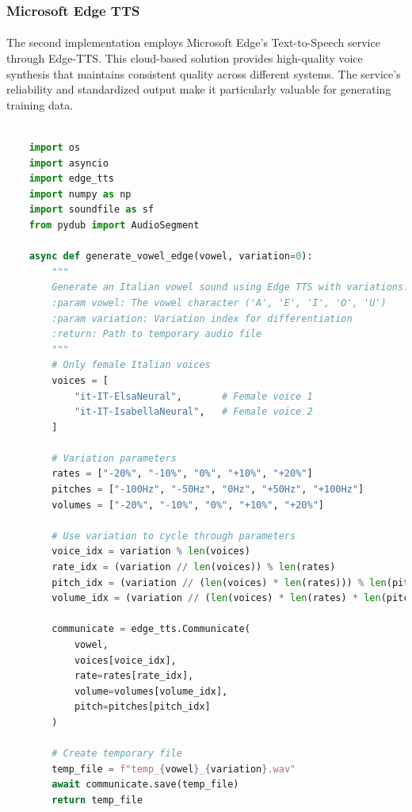 \subsubsection{Microsoft Edge TTS}
\paragraph{}
The second implementation employs Microsoft Edge's Text-to-Speech service through Edge-TTS. This cloud-based solution provides high-quality voice synthesis that maintains consistent quality across different systems. The service's reliability and standardized output make it particularly valuable for generating training data.

\begin{lstlisting}[language=Python, caption={Audio Generation with Edge TTS}]

    import os
    import asyncio
    import edge_tts
    import numpy as np
    import soundfile as sf
    from pydub import AudioSegment
    
    async def generate_vowel_edge(vowel, variation=0):
        """
        Generate an Italian vowel sound using Edge TTS with variations.
        :param vowel: The vowel character ('A', 'E', 'I', 'O', 'U')
        :param variation: Variation index for differentiation
        :return: Path to temporary audio file
        """
        # Only female Italian voices
        voices = [
            "it-IT-ElsaNeural",       # Female voice 1
            "it-IT-IsabellaNeural",   # Female voice 2
        ]
        
        # Variation parameters
        rates = ["-20%", "-10%", "0%", "+10%", "+20%"]
        pitches = ["-100Hz", "-50Hz", "0Hz", "+50Hz", "+100Hz"]
        volumes = ["-20%", "-10%", "0%", "+10%", "+20%"]
        
        # Use variation to cycle through parameters
        voice_idx = variation % len(voices)
        rate_idx = (variation // len(voices)) % len(rates)
        pitch_idx = (variation // (len(voices) * len(rates))) % len(pitches)
        volume_idx = (variation // (len(voices) * len(rates) * len(pitches))) % len(volumes)
        
        communicate = edge_tts.Communicate(
            vowel,
            voices[voice_idx],
            rate=rates[rate_idx],
            volume=volumes[volume_idx],
            pitch=pitches[pitch_idx]
        )
        
        # Create temporary file
        temp_file = f"temp_{vowel}_{variation}.wav"
        await communicate.save(temp_file)
        return temp_file
    

\end{lstlisting}
